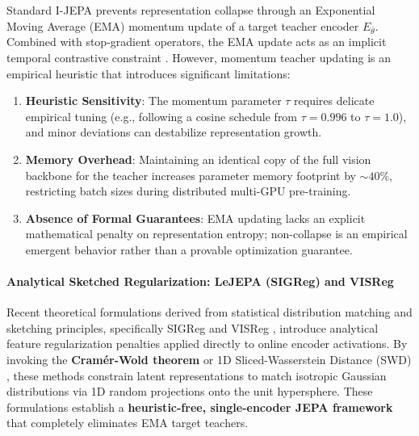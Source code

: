 \documentclass{article}
\begin{document}
Standard I-JEPA \citep{assran2023ijepa} prevents representation collapse through an Exponential Moving Average (EMA) momentum update of a target teacher encoder $E_{\bar{\theta}}$. Combined with stop-gradient operators, the EMA update acts as an implicit temporal contrastive constraint \citep{grill2020bootstrap,assran2023ijepa}. However, momentum teacher updating is an empirical heuristic that introduces significant limitations:
\begin{enumerate}
    \item \textbf{Heuristic Sensitivity}: The momentum parameter $\tau$ requires delicate empirical tuning (e.g., following a cosine schedule from $\tau=0.996$ to $\tau=1.0$), and minor deviations can destabilize representation growth.
    \item \textbf{Memory Overhead}: Maintaining an identical copy of the full vision backbone for the teacher increases parameter memory footprint by $\sim 40\%$, restricting batch sizes during distributed multi-GPU pre-training.
    \item \textbf{Absence of Formal Guarantees}: EMA updating lacks an explicit mathematical penalty on representation entropy; non-collapse is an empirical emergent behavior rather than a provable optimization guarantee.
\end{enumerate}

\paragraph{Analytical Sketched Regularization: LeJEPA (SIGReg) and VISReg}
Recent theoretical formulations derived from statistical distribution matching and sketching principles, specifically SIGReg \citep{balestriero2025lejepa} and VISReg \citep{wu2026visreg}, introduce analytical feature regularization penalties applied directly to online encoder activations. By invoking the \textbf{Cram\'er-Wold theorem} \citep{cramer1936theorems} or 1D Sliced-Wasserstein Distance (SWD) \citep{bonneel2015sliced,villani2009optimal}, these methods constrain latent representations to match isotropic Gaussian distributions via 1D random projections onto the unit hypersphere. These formulations establish a \textbf{heuristic-free, single-encoder JEPA framework} that completely eliminates EMA target teachers.
\end{document}

